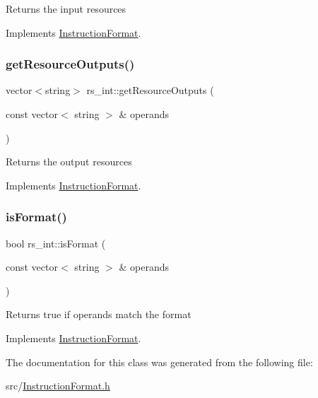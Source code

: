 Returns the input resources 

Implements \hyperlink{classInstructionFormat_a09775d3a3c22f40a0f44504664e586e4}{Instruction\+Format}.

\mbox{\label{classrs__int_a8c83bc7081f9ff48657aaf5d7fbbaf1d}} 
\subsubsection{\texorpdfstring{get\+Resource\+Outputs()}{getResourceOutputs()}}
{\footnotesize\ttfamily vector$<$string$>$ rs\+\_\+int\+::get\+Resource\+Outputs (\begin{DoxyParamCaption}\item[{const vector$<$ string $>$ \&}]{operands }\end{DoxyParamCaption})\hspace{0.3cm}{\ttfamily [virtual]}}

Returns the output resources 

Implements \hyperlink{classInstructionFormat_a95cd28ffb1bde59b67f676880ab10536}{Instruction\+Format}.

\mbox{\label{classrs__int_ad8660fae74d3763a5068b22a79ffdd92}} 
\subsubsection{\texorpdfstring{is\+Format()}{isFormat()}}
{\footnotesize\ttfamily bool rs\+\_\+int\+::is\+Format (\begin{DoxyParamCaption}\item[{const vector$<$ string $>$ \&}]{operands }\end{DoxyParamCaption})\hspace{0.3cm}{\ttfamily [virtual]}}

Returns true if operands match the format 

Implements \hyperlink{classInstructionFormat_a9fdcf94dcd7d9a55ba86e7a63f04d1fe}{Instruction\+Format}.



The documentation for this class was generated from the following file\+:\begin{DoxyCompactItemize}
\item 
src/\hyperlink{InstructionFormat_8h}{Instruction\+Format.\+h}\end{DoxyCompactItemize}
